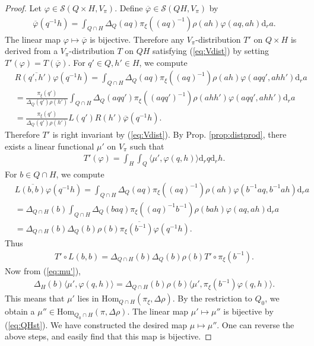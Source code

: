 \documentclass[11pt]{amsart}
\newcommand\vp{\varphi}%
\newcommand\dr{\mathrm{d}}
\newcommand\Ss{{\mathscr{S}}}
\newcommand\1{\mathbf{1}}
\newcommand\ol{\overline}%
\newcommand\Hom{{\mathrm{Hom}}}%
\newcommand\tm{\times}
\numberwithin{equation}{section}
\begin{document}
\begin{proof}
Let $\vp \in \Ss(Q \tm H, V_\pi)$.
Define $\ol{\vp} \in \Ss(QH, V_\pi)$ by 
\begin{align*}
\ol{\vp}(q^{-1}h) = \int_{Q \cap H} \Delta_Q(aq) \pi_\xi((aq)^{-1})\rho(ah) \vp(aq, a h) \dr_ra.
\end{align*} 
The linear map $\vp \mapsto \ol{\vp}$ is bijective.
Therefore any $V_\pi$-distribution $T'$ on $Q \tm H$ is derived from a $V_\pi$-distribution $T$ on $QH$ satisfying (\ref{eq:Vdist}) by setting $T'(\vp) = T(\ol{\vp})$.
For $q' \in Q, h' \in H$, we compute
\begin{align*}
&\ol{R(q',h') \vp}(q^{-1}h) 
= \int_{Q \cap H} \Delta_{Q}(aq) \pi_\xi((aq)^{-1})\rho(ah) \vp(aqq', a hh') \dr_ra \\
&= \frac{\pi_\xi(q')}{\Delta_{Q}(q')\rho(h')}\int_{Q \cap H} \Delta_{Q}(aqq') \pi_\xi((aqq')^{-1})\rho(ahh') \vp(aqq', a hh') \dr_ra \\
&= \frac{\pi_\xi(q')}{\Delta_{Q}(q')\rho(h')} L(q')R(h')\ol{\vp}(q^{-1}h). 
\end{align*} 
Therefore $T'$ is right invariant by (\ref{eq:Vdist}).
By Prop. \ref{prop:distprod}, there exists a linear functional $\mu'$ on $V_\pi$ such that 
\begin{align}
T'(\vp) = \int _H \int_{Q} \langle \mu', \vp(q,h) \rangle \dr_rq \dr_rh. \label{eq:mu'}
\end{align} 
For $b \in Q \cap H$, we compute
\begin{align*}
& \ol{L(b,b)\vp}(q^{-1}h) = \int_{Q \cap H} \Delta_Q(aq) \pi_\xi((aq)^{-1})\rho(ah) \vp(b^{-1}aq, b^{-1}a h) \dr_ra \\
&= \Delta_{Q \cap H}(b) \int_{Q \cap H} \Delta_Q(baq)\pi_\xi((aq)^{-1}b^{-1})\rho(bah) \vp(aq, a h) \dr_ra \\
&= \Delta_{Q \cap H}(b) \Delta_Q(b) \rho(b)\ol{\pi_\xi(b^{-1})\vp}(q^{-1}h).
\end{align*} 
Thus 
\begin{align*}
T' \circ L(b,b) = \Delta_{Q \cap H}(b) \Delta_Q(b) \rho(b) T' \circ \pi_\xi(b^{-1}).
\end{align*} 
Now from (\ref{eq:mu'}), 
\begin{align*}
\Delta_H(b) \langle \mu', \vp(q,h) \rangle = \Delta_{Q \cap H}(b) \rho(b) \langle \mu', \pi_\xi(b^{-1})\vp(q,h) \rangle.
\end{align*}  
This means that $\mu'$ lies in $\Hom_{Q \cap H}(\pi_\xi, \Delta \rho)$. 
By the restriction to $Q_0$, we obtain a $\mu'' \in \Hom_{Q_0 \cap H}(\pi, \Delta\rho)$. 
The linear map $\mu' \mapsto \mu''$ is bijective by (\ref{eq:QHst}).
We have constructed the desired map $\mu \mapsto \mu''$.
One can reverse the above steps, and easily find that this map is bijective.
\end{proof}
\end{document}
